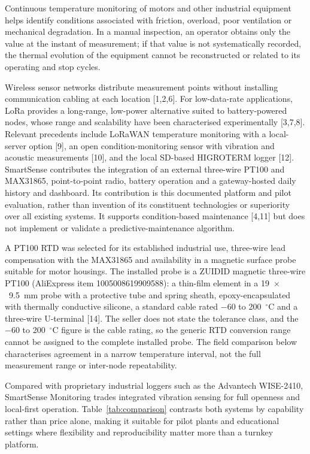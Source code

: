 \documentclass[11pt, letterpaper]{article}
\begin{document}
Continuous temperature monitoring of motors and other industrial equipment helps identify conditions associated with friction, overload, poor ventilation or mechanical degradation. In a manual inspection, an operator obtains only the value at the instant of measurement; if that value is not systematically recorded, the thermal evolution of the equipment cannot be reconstructed or related to its operating and stop cycles.

Wireless sensor networks distribute measurement points without installing communication cabling at each location [1,2,6]. For low-data-rate applications, LoRa provides a long-range, low-power alternative suited to battery-powered nodes, whose range and scalability have been characterised experimentally [3,7,8]. Relevant precedents include LoRaWAN temperature monitoring with a local-server option [9], an open condition-monitoring sensor with vibration and acoustic measurements [10], and the local SD-based HIGROTERM logger [12]. SmartSense contributes the integration of an external three-wire PT100 and MAX31865, point-to-point radio, battery operation and a gateway-hosted daily history and dashboard. Its contribution is this documented platform and pilot evaluation, rather than invention of its constituent technologies or superiority over all existing systems. It supports condition-based maintenance [4,11] but does not implement or validate a predictive-maintenance algorithm.

A PT100 RTD was selected for its established industrial use, three-wire lead compensation with the MAX31865 and availability in a magnetic surface probe suitable for motor housings. The installed probe is a ZUIDID magnetic three-wire PT100 (AliExpress item 1005008619909588): a thin-film element in a 19~$\times$~9.5~mm probe with a protective tube and spring sheath, epoxy-encapsulated with thermally conductive silicone, a standard cable rated $-60$ to 200~$^{\circ}$C and a three-wire U-terminal [14]. The seller does not state the tolerance class, and the $-60$ to 200~$^{\circ}$C figure is the cable rating, so the generic RTD conversion range cannot be assigned to the complete installed probe. The field comparison below characterises agreement in a narrow temperature interval, not the full measurement range or inter-node repeatability.

Compared with proprietary industrial loggers such as the Advantech WISE-2410, SmartSense Monitoring trades integrated vibration sensing for full openness and local-first operation. Table~\ref{tab:comparison} contrasts both systems by capability rather than price alone, making it suitable for pilot plants and educational settings where flexibility and reproducibility matter more than a turnkey platform.
\end{document}
